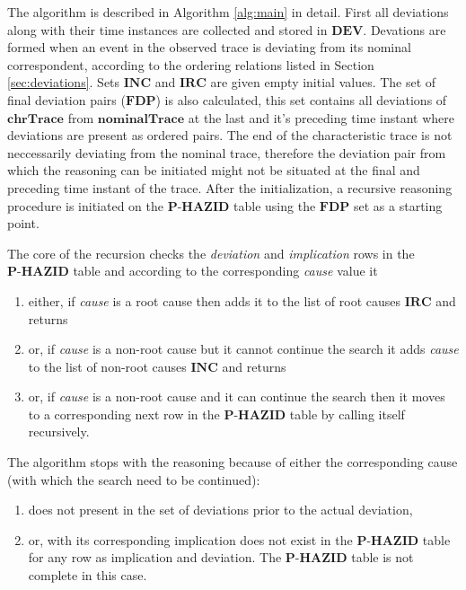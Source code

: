 \documentclass[conference]{IEEEtran}
\begin{document}
The algorithm is described in Algorithm \ref{alg:main} in detail. First all deviations along with their time instances are collected and stored in $\mathbf{DEV}$. Devations are formed when an event in the observed trace is deviating from its nominal correspondent, according to the ordering relations listed in Section \ref{sec:deviations}. Sets $\mathbf{INC}$ and $\mathbf{IRC}$ are given empty initial values. The set of final deviation pairs ($\mathbf{FDP}$) is also calculated, this set contains all deviations of $\mathbf{chrTrace}$ from $\mathbf{nominalTrace}$ at the last and it's preceding time instant where deviations are present as ordered pairs. The end of the characteristic trace is not neccessarily deviating from the nominal trace, therefore the deviation pair from which the reasoning can be initiated might not be situated at the final and preceding time instant of the trace. After the initialization, a recursive reasoning procedure is initiated on the $\textbf{P-HAZID}$ table using the $\mathbf{FDP}$ set as a starting point.

The core of the recursion checks the \textit{deviation} and \textit{implication} rows in the $\textbf{P-HAZID}$ table and according to the corresponding \textit{cause} value it
\begin{enumerate}
\item either, if \textit{cause} is a root cause then adds it to the list of root causes $\mathbf{IRC}$ and returns
\item or, if \textit{cause} is a non-root cause but it cannot continue the search it adds \textit{cause} to the list of non-root causes $\mathbf{INC}$ and returns
\item or, if \textit{cause} is a non-root cause and it can continue the search then it moves to a corresponding next row in the $\textbf{P-HAZID}$ table by calling itself recursively.
\end{enumerate}

The algorithm stops with the reasoning because of either the corresponding cause (with which the search need to be continued):
\begin{enumerate}
\item does not present in the set of deviations prior to the actual deviation,
\item or, with its corresponding implication does not exist in the $\textbf{P-HAZID}$ table for any row as implication and deviation. The $\textbf{P-HAZID}$ table is not complete in this case.
\end{enumerate}
\end{document}
